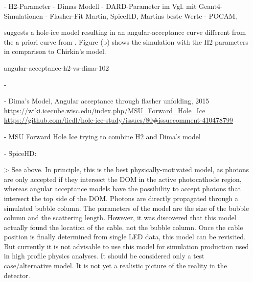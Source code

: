 %



%


- H2-Parameter
- Dimas Modell
- DARD-Parameter im Vgl. mit Geant4-Simulationen
- Flasher-Fit Martin, SpiceHD, Martins beste Werte
- POCAM,



 suggests a hole-ice model resulting in an angular-acceptance curve different from the a priori curve from \cite{icepaper}. Figure (b) shows the simulation with the H2 parameters in comparison to Chirkin's model.

angular-acceptance-h2-vs-dima-102

- 

- Dima's Model, Angular acceptance through flasher unfolding, 2015
  \url{https://wiki.icecube.wisc.edu/index.php/MSU_Forward_Hole_Ice}
  \url{https://github.com/fiedl/hole-ice-study/issues/80#issuecomment-410478799}

- MSU Forward Hole Ice
  trying to combine H2 and Dima's model



- SpiceHD:

> See above. In principle, this is the best physically-motivated model, as photons are only accepted if they intersect the DOM in the active photocathode region, whereas angular acceptance models have the possibility to accept photons that intersect the top side of the DOM. Photons are directly propagated through a simulated bubble column. The parameters of the model are the size of the bubble column and the scattering length. However, it was discovered that this model actually found the location of the cable, not the bubble column. Once the cable position is finally determined from single LED data, this model can be revisited. But currently it is not advisable to use this model for simulation production used in high profile physics analyses. It should be considered only a test case/alternative model. It is not yet a realistic picture of the reality in the detector.

